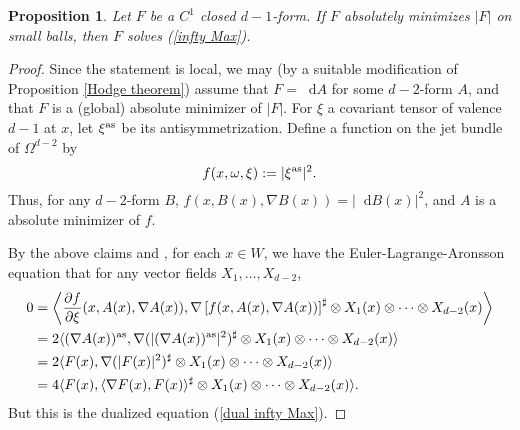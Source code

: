 \documentclass[reqno,11pt]{amsart}
\newcommand*\dif{\mathop{}\!\mathrm{d}}
\newtheorem{proposition}[theorem]{Proposition}
\theoremstyle{definition}
\numberwithin{equation}{section}
\begin{document}
\begin{proposition}
Let $F$ be a $C^1$ closed $d - 1$-form.
If $F$ absolutely minimizes $|F|$ on small balls, then $F$ solves (\ref{infty Max}).
\end{proposition}
\begin{proof}
Since the statement is local, we may (by a suitable modification of Proposition \ref{Hodge theorem}) assume that $F = \dif A$ for some $d - 2$-form $A$, and that $F$ is a (global) absolute minimizer of $|F|$.
For $\xi$ a covariant tensor of valence $d - 1$ at $x$, let $\xi^{\rm as}$ be its antisymmetrization.
Define a function on the jet bundle of $\Omega^{d - 2}$ by
$$f(x, \omega, \xi) := |\xi^{\rm as}|^2.$$
Thus, for any $d - 2$-form $B$, $f(x, B(x), \nabla B(x)) = |\dif B(x)|^2$, and $A$ is a absolute minimizer of $f$.

By the above claims and \cite[Theorem 5.2]{Barron2001}, for each $x \in W$, we have the Euler-Lagrange-Aronsson equation that for any vector fields $X_1, \dots, X_{d - 2}$,
\begin{align*}
0 
&= \left\langle \frac{\partial f}{\partial \xi}(x, A(x), \nabla A(x)), \nabla \left[f(x, A(x), \nabla A(x))\right]^\sharp \otimes X_1(x) \otimes \cdots \otimes X_{d - 2}(x)\right\rangle \\
&= 2\langle (\nabla A(x))^{\rm as}, \nabla(|(\nabla A(x))^{\rm as}|^2)^\sharp \otimes X_1(x) \otimes \cdots \otimes X_{d - 2}(x)\rangle \\
&= 2\langle F(x), \nabla(|F(x)|^2)^\sharp \otimes X_1(x) \otimes \cdots \otimes X_{d - 2}(x)\rangle \\
&= 4\langle F(x), \langle \nabla F(x), F(x)\rangle^\sharp \otimes X_1(x) \otimes \cdots \otimes X_{d - 2}(x)\rangle.
\end{align*}
But this is the dualized equation (\ref{dual infty Max}).
\end{proof}
\end{document}
